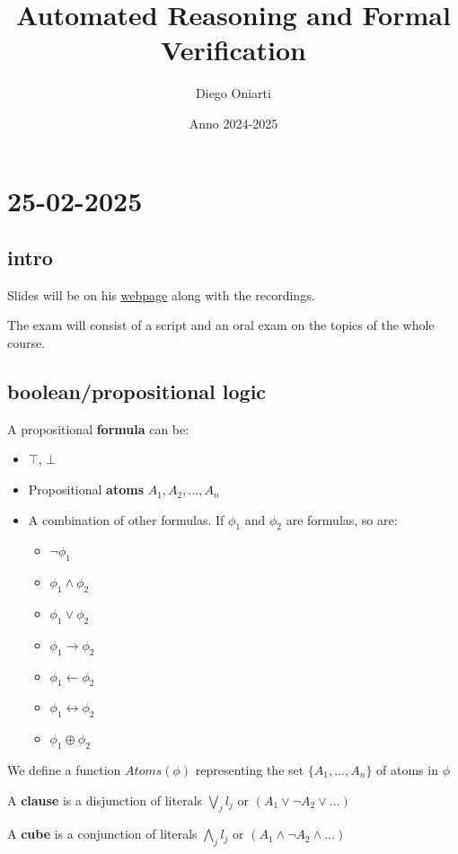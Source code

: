 \documentclass{article}
\title{Automated Reasoning and Formal Verification}
\author{Diego Oniarti}
\date{Anno 2024-2025}
\begin{document}
\maketitle
\tableofcontents

\section{25-02-2025}
\subsection*{intro}
Slides will be on his \href{https://disi.unitn.it/rseba/DIDATTICA/arfv2025/}{webpage} along with the recordings.

The exam will consist of a script and an oral exam on the topics of the whole course.

\subsection*{boolean/propositional logic}
A propositional \textbf{formula} can be:
\begin{itemize}
    \item $\top$, $\bot$
    \item Propositional \textbf{atoms} $A_1, A_2, \dots, A_n$
    \item A combination of other formulas. If $\phi_1$ and $\phi_2$ are formulas, so are:
        \begin{itemize}
            \item $\neg \phi_1$
            \item $\phi_1\wedge\phi_2$
            \item $\phi_1\vee\phi_2$
            \item $\phi_1\to\phi_2$
            \item $\phi_1\leftarrow\phi_2$
            \item $\phi_1\leftrightarrow\phi_2$
            \item $\phi_1\oplus\phi_2$
        \end{itemize}
\end{itemize}

We define a function $Atoms(\phi)$ representing the set $\{A_1,\dots,A_n\}$ of atoms in $\phi$

A \textbf{clause} is a disjunction of literals $\bigvee_j l_j$ or $(A_1\vee \neg A_2 \vee ...)$

A \textbf{cube} is a conjunction of literals $\bigwedge_j l_j$ or $(A_1\wedge \neg A_2 \wedge ...)$
\end{document}
